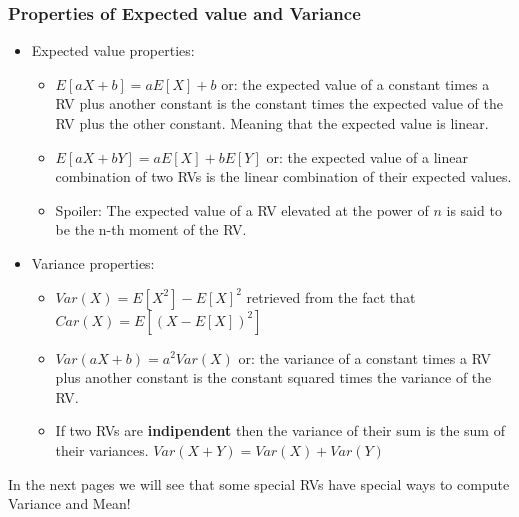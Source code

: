 \documentclass[a4paper]{article}
\begin{document}
\subsubsection{Properties of Expected value and Variance}
\begin{itemize}
    \item Expected value properties:\begin{itemize}
        \item \( E[aX + b] = aE[X] + b \) or: the expected value of a constant times a RV plus another constant is the constant times the expected value of the RV plus the other constant. Meaning that the expected value is linear.
        \item \( E[aX + bY] = aE[X] + bE[Y] \) or: the expected value of a linear combination of two RVs is the linear combination of their expected values.
        \item Spoiler: The expected value of a RV elevated at the power of $n$ is said to be the n-th moment of the RV. 
    \end{itemize}
    \item Variance properties:\begin{itemize}
        \item $ Var(X) = E[X^2] - E[X]^2$ retrieved from the fact that $Car(X) = E[(X - E[X])^2]$
        \item \( Var(aX + b) = a^2Var(X) \) or: the variance of a constant times a RV plus another constant is the constant squared times the variance of the RV.
        \item If two RVs are \textbf{indipendent} then the variance of their sum is the sum of their variances. $Var(X + Y) = Var(X) + Var(Y)$
    \end{itemize}
\end{itemize}

\centerline{In the next pages we will see that some special RVs have special ways to compute Variance and Mean!}
\end{document}
